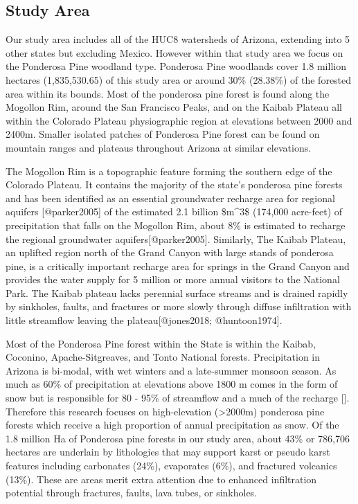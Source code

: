 \documentclass[
  number,
  preprint,
  3p,
  onecolumn]{elsarticle}
\begin{document}
\subsection{Study Area}\label{study-area}

Our study area includes all of the HUC8 watersheds of Arizona, extending
into 5 other states but excluding Mexico. However within that study area
we focus on the Ponderosa Pine woodland type. Ponderosa Pine woodlands
cover 1.8 million hectares (1,835,530.65) of this study area or around
30\% (28.38\%) of the forested area within its bounds. Most of the
ponderosa pine forest is found along the Mogollon Rim, around the San
Francisco Peaks, and on the Kaibab Plateau all within the Colorado
Plateau physiographic region at elevations between 2000 and 2400m.
Smaller isolated patches of Ponderosa Pine forest can be found on
mountain ranges and plateaus throughout Arizona at similar elevations.

The Mogollon Rim is a topographic feature forming the southern edge of
the Colorado Plateau. It contains the majority of the state's ponderosa
pine forests and has been identified as an essential groundwater
recharge area for regional aquifers {[}@parker2005{]} of the estimated
2.1 billion \$m\^{}3\$ (174,000 acre-feet) of precipitation that falls
on the Mogollon Rim, about 8\% is estimated to recharge the regional
groundwater aquifers{[}@parker2005{]}. Similarly, The Kaibab Plateau, an
uplifted region north of the Grand Canyon with large stands of ponderosa
pine, is a critically important recharge area for springs in the Grand
Canyon and provides the water supply for 5 million or more annual
visitors to the National Park. The Kaibab plateau lacks perennial
surface streams and is drained rapidly by sinkholes, faults, and
fractures or more slowly through diffuse infiltration with little
streamflow leaving the plateau{[}@jones2018; @huntoon1974{]}.

Most of the Ponderosa Pine forest within the State is within the Kaibab,
Coconino, Apache-Sitgreaves, and Tonto National forests. Precipitation
in Arizona is bi-modal, with wet winters and a late-summer monsoon
season. As much as 60\% of precipitation at elevations above 1800 m
comes in the form of snow but is responsible for 80 - 95\% of streamflow
and a much of the recharge {[}\citep{baker2013}{]}\citep{eastoe2023}.
Therefore this research focuses on high-elevation (\textgreater2000m)
ponderosa pine forests which receive a high proportion of annual
precipitation as snow. Of the 1.8 million Ha of Ponderosa pine forests
in our study area, about 43\% or 786,706 hectares are underlain by
lithologies that may support karst or pseudo karst features including
carbonates (24\%), evaporates (6\%), and fractured volcanics (13\%).
These are areas merit extra attention due to enhanced infiltration
potential through fractures, faults, lava tubes, or sinkholes.
\end{document}
